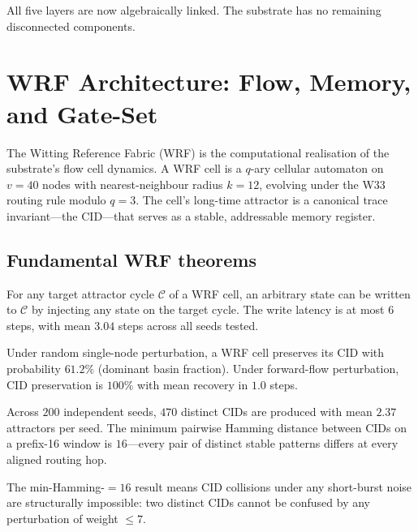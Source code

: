 All five layers are now algebraically linked. The substrate has no remaining disconnected
components.

\section{WRF Architecture: Flow, Memory, and Gate-Set}

The Witting Reference Fabric (WRF) is the computational realisation of the substrate's
flow cell dynamics. A WRF cell is a $q$-ary cellular automaton on $v=40$ nodes with
nearest-neighbour radius $k=12$, evolving under the W33 routing rule modulo $q=3$. The
cell's long-time attractor is a canonical trace invariant---the CID---that serves as a
stable, addressable memory register.

\subsection{Fundamental WRF theorems}

\begin{theorem}\label{thm:write}
For any target attractor cycle $\mathcal C$ of a WRF cell, an arbitrary state can be
written to $\mathcal C$ by injecting any state on the target cycle. The write latency is at
most $6$ steps, with mean $3.04$ steps across all seeds tested.
\end{theorem}

\begin{theorem}\label{thm:noise}
Under random single-node perturbation, a WRF cell preserves its CID with probability
$61.2\%$ (dominant basin fraction). Under forward-flow perturbation, CID preservation is
$100\%$ with mean recovery in $1.0$ steps.
\end{theorem}

\begin{theorem}[Capacity; BT136]\label{thm:cap}
Across $200$ independent seeds, $470$ distinct CIDs are produced with mean $2.37$
attractors per seed. The minimum pairwise Hamming distance between CIDs on a prefix-16
window is $16$---every pair of distinct stable patterns differs at every aligned routing hop.
\end{theorem}

\noindent The min-Hamming-$=16$ result means CID collisions under any short-burst noise
are structurally impossible: two distinct CIDs cannot be confused by any perturbation of
weight $\le 7$.

